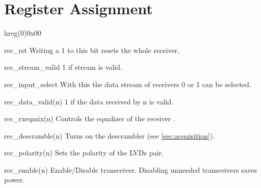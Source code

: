 \documentclass[12pt,a4paper,parskip=full,abstract=true,BCOR=12mm,twoside,open=right]{scrreprt}
\begin{document}
\section{Register Assignment}
\label{sec:registers}
\begin{register}{h}{reg(0)}{0x00}%
    \label{reg0}%
    \regnewline%
    \begin{regdesc}\begin{reglist}
        \item[rec\_rst] Writing a 1 to this bit resets the whole receiver.
        \item[rec\_stream\_valid] 1 if stream is valid.
        \item[rec\_input\_select] With this the data stream of receivers 0 or 1
            can be selected.
        \item[rec\_data\_valid(n)] 1 if the data received by n is valid.
        \item[rec\_rxeqmix(n)] Controls the equalizer of the receiver
            \cite{gtx}.
        \item[rec\_descramble(n)] Turns on the descrambler (see
            \cref{sec:acquisition}).
        \item[rec\_polarity(n)] Sets the polarity of the LVDs pair.
        \item[rec\_enable(n)] Enable/Disable transceiver. Disabling unneeded
            transceivers saves power.
    \end{reglist}\end{regdesc}
\end{register}
\end{document}
